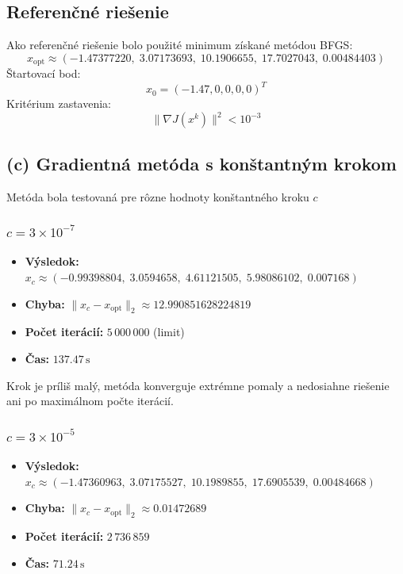 \documentclass[titlepage]{article}
\begin{document}
\subsection*{Referenčné riešenie}

Ako referenčné riešenie bolo použité minimum získané metódou BFGS:
\[
x_{\text{opt}} \approx
(-1.47377220,\; 3.07173693,\; 10.1906655,\; 17.7027043,\; 0.00484403)
\]
Štartovací bod:
\[
x_0 = (-1.47, 0, 0, 0, 0)^T
\]
Kritérium zastavenia:
\[
\|\nabla J(x^k)\|^2 < 10^{-3}
\]

\newpage
\subsection*{(c) Gradientná metóda s konštantným krokom}

Metóda bola testovaná pre rôzne hodnoty konštantného kroku $c$
\subsubsection*{$c = 3 \times 10^{-7}$}

\begin{itemize}
    \item \textbf{Výsledok:} $x_c \approx (-0.99398804,\; 3.0594658,\; 4.61121505,\; 5.98086102,\; 0.007168)$
    \item \textbf{Chyba:} $\|x_c - x_{\text{opt}}\|_2 \approx 12.990851628224819$
    \item \textbf{Počet iterácií:} $5\,000\,000$ (limit)
    \item \textbf{Čas:} $137.47\,\mathrm{s}$
\end{itemize}

Krok je príliš malý, metóda konverguje extrémne pomaly a nedosiahne riešenie ani po maximálnom počte iterácií.

\subsubsection*{$c = 3 \times 10^{-5}$}

\begin{itemize}
    \item \textbf{Výsledok:} $x_c \approx (-1.47360963,\; 3.07175527,\; 10.1989855,\; 17.6905539,\; 0.00484668)$
    \item \textbf{Chyba:} $\|x_c - x_{\text{opt}}\|_2 \approx 0.01472689$
    \item \textbf{Počet iterácií:} $2\,736\,859$
    \item \textbf{Čas:} $71.24\,\mathrm{s}$
\end{itemize}
\end{document}
